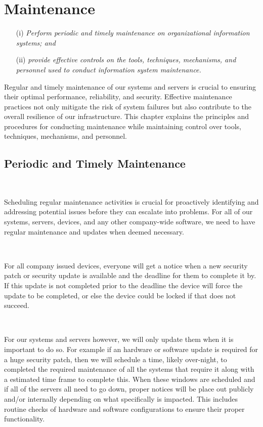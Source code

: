 \documentclass[12pt,a4paper]{report}
\begin{document}
\chapter{Maintenance}
\begin{enumerate}
 \item[(i)] \textit{Perform periodic and timely maintenance on organizational information systems; and}
 \item[(ii)] \textit{provide effective controls on the tools, techniques, mechanisms, and personnel used to conduct information system maintenance.}
\end{enumerate}

Regular and timely maintenance of our systems and servers is crucial to ensuring their optimal performance, reliability, and security. 
Effective maintenance practices not only mitigate the risk of system failures but also contribute to the overall resilience of our infrastructure. 
This chapter explains the principles and procedures for conducting maintenance while maintaining control over tools, techniques, mechanisms, and personnel.

\section{Periodic and Timely Maintenance}
\

Scheduling regular maintenance activities is crucial for proactively identifying and addressing potential issues before they can escalate into problems.
For all of our systems, servers, devices, and any other company-wide software, we need to have regular maintenance and updates when deemed necessary.

\

For all company issued devices, everyone will get a notice when a new security patch or security update is available and the deadline for them to complete it by.
If this update is not completed prior to the deadline the device will force the update to be completed, or else the device could be locked if that does not succeed.

\

For our systems and servers however, we will only update them when it is important to do so.
For example if an hardware or software update is required for a huge security patch, then we will schedule a time, likely over-night, to completed the required maintenance of all the systems that require it along with a estimated time frame to complete this.
When these windows are scheduled and if all of the servers all need to go down, proper notices will be place out publicly and/or internally depending on what specifically is impacted.
This includes routine checks of hardware and software configurations to ensure their proper functionality.
\end{document}
